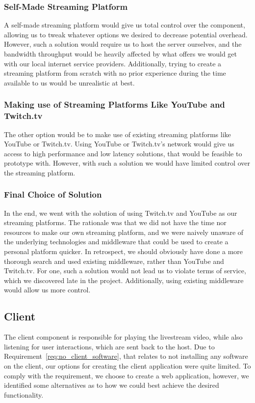 \subsubsection{Self-Made Streaming Platform}
A self-made streaming platform would give us total control over the component, allowing us to tweak whatever options we desired to decrease potential overhead. However, such a solution would require us to host the server ourselves, and the bandwidth throughput would be heavily affected by what offers we would get with our local internet service providers. Additionally, trying to create a streaming platform from scratch with no prior experience during the time available to us would be unrealistic at best. 

\subsubsection{Making use of Streaming Platforms Like YouTube and Twitch.tv}
The other option would be to make use of existing streaming platforms like YouTube or Twitch.tv. Using YouTube or Twitch.tv's network would give us access to high performance and low latency solutions, that would be feasible to prototype with. However, with such a solution we would have limited control over the streaming platform.

\subsubsection{Final Choice of Solution}
\label{par:stream_dist_final}
In the end, we went with the solution of using Twitch.tv and YouTube as our streaming platforms. The rationale was that we did not have the time nor resources to make our own streaming platform, and we were naively unaware of the underlying technologies and middleware that could be used to create a personal platform quicker. In retrospect, we should obviously have done a more thorough search and used existing middleware, rather than YouTube and Twitch.tv. For one, such a solution would not lead us to violate terms of service\cite[5.1 G]{youtube_guidelines}\cite[9 viii]{ twitch_guidelines}, which we discovered late in the project. Additionally, using existing middleware would allow us more control. 

\subsection{Client}
The client component is responsible for playing the livestream video, while also listening for user interactions, which are sent back to the host.
Due to Requirement~\ref{req:no_client_software}, that relates to not installing any software on the client, our options for creating the client application were quite limited. 
To comply with the requirement, we choose to create a web application, however, we identified some alternatives as to how we could best achieve the desired functionality.

